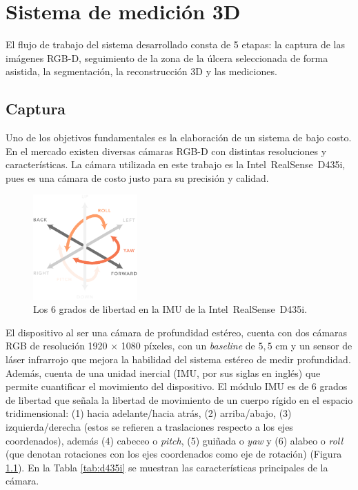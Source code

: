 \chapter{Sistema de medición 3D}\label{chapter:proposal}

El flujo de trabajo del sistema desarrollado consta de 5 etapas: la captura de las imágenes RGB-D, seguimiento de la zona de la úlcera seleccionada de forma asistida, la segmentación, la reconstrucción 3D y las mediciones.

\section{Captura}

Uno de los objetivos fundamentales es la elaboración de un sistema de bajo costo. En el mercado existen diversas cámaras RGB-D con distintas resoluciones y características. La cámara utilizada en este trabajo es la Intel\textregistered~RealSense\texttrademark~D435i, pues es una cámara de costo justo para su precisión y calidad.

\begin{figure}[ht]
	\centering
	\includegraphics[width=4cm]{./Graphics/6dof.png}
	\caption{Los 6 grados de libertad en la IMU de la Intel\textregistered~RealSense\texttrademark~D435i.}
	\label{fig:6dof}
\end{figure}

El dispositivo al ser una cámara de profundidad estéreo, cuenta con dos cámaras RGB de resolución 1920 $\times$ 1080 píxeles, con un \textit{baseline} de $5,5$ cm y un sensor de láser infrarrojo que mejora la habilidad del sistema estéreo de medir profundidad. Además, cuenta de una unidad inercial (IMU, por sus siglas en inglés) que permite cuantificar el movimiento del dispositivo. El módulo IMU es de 6 grados de libertad que señala la libertad de movimiento de un cuerpo rígido en el espacio tridimensional: (1) hacia adelante/hacia atrás, (2) arriba/abajo, (3) izquierda/derecha (estos se refieren a traslaciones respecto a los ejes coordenados), además (4) cabeceo o \textit{pitch}, (5) guiñada o \textit{yaw} y (6) alabeo o \textit{roll} (que denotan rotaciones con los ejes coordenados como eje de rotación) (Figura \ref{fig:6dof}). En la Tabla \ref{tab:d435i} se muestran las características principales de la cámara.

